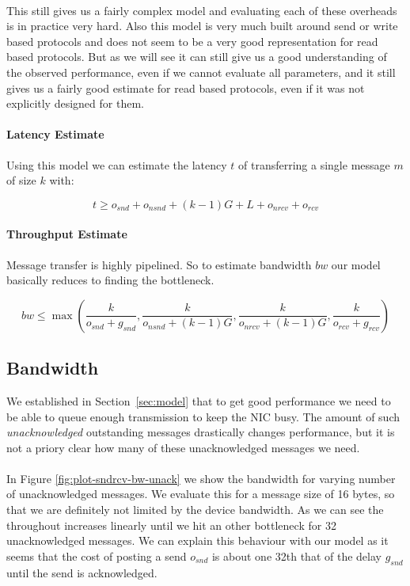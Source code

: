 \paragraph{} This still gives us a fairly complex model and evaluating each of these overheads is in practice very hard. 
Also this model is very much built around send or write based protocols and does not seem to be a very good representation 
for read based protocols. But as we will see it can still give us a good understanding of the observed performance, even if 
we cannot evaluate all parameters, and it still gives us a fairly good estimate for read based protocols, even if it was not
explicitly designed for them.

\paragraph{Latency Estimate}

Using this model we can estimate the latency $t$ of transferring a single message $m$ of size $k$ with:

$$
t \geq o_{snd} + o_{nsnd}  + (k-1)G + L + o_{nrcv} + o_{rcv}
$$


\paragraph{Throughput Estimate}

Message transfer is highly pipelined. So to estimate bandwidth $bw$ our model basically reduces to finding the bottleneck.

$$
bw \leq \max ( \frac{k}{o_{snd} + g_{snd}}, \frac{k}{o_{nsnd} + (k-1)G}, \frac{k}{o_{nrcv} + (k-1)G}, \frac{k}{o_{rcv} + g_{rcv}})
$$


\subsection{Bandwidth}

We established in Section~\ref{sec:model} that to get good performance we need to be able to queue enough transmission
to keep the NIC busy. The amount of such \emph{unacknowledged} outstanding messages drastically changes performance, 
but it is not a priory clear how many of these unacknowledged messages we need. 

\paragraph{} In Figure \ref{fig:plot-sndrcv-bw-unack} we show the bandwidth for varying number of unacknowledged
messages. We evaluate this for a message size of 16 bytes, so that we are definitely not limited by the device bandwidth.
As we can see the throughout increases linearly until we hit an other bottleneck for 32 unacknowledged messages. We can 
explain this behaviour with our model as it seems that the cost of posting a send $o_{snd}$ is about one 32th that of the 
delay $g_{snd}$ until the send is acknowledged.


